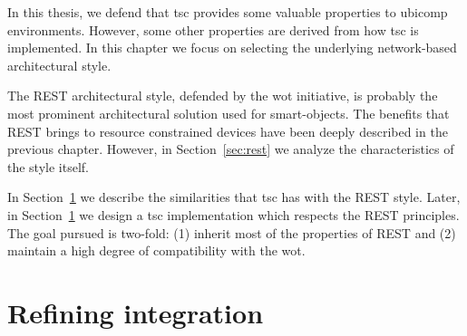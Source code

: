 In this thesis, we defend that \acf{tsc} provides some valuable properties to \ac{ubicomp} environments. %
However, some other properties are derived from how \ac{tsc} is implemented.
In this chapter we focus on selecting the underlying network-based architectural style.


The REST architectural style, defended by the \acf{wot} initiative, is probably the most prominent architectural solution used for smart-objects. %
The benefits that REST brings to resource constrained devices have been deeply described in the previous chapter.
However, in Section~\ref{sec:rest} we analyze the characteristics of the style itself.

In Section~\ref{} we describe the similarities that \ac{tsc} has with the REST style.
Later, in Section~\ref{} we design a \ac{tsc} implementation which respects the REST principles.
The goal pursued is two-fold: (1) inherit most of the properties of REST and (2) maintain a high degree of compatibility with the \ac{wot}.








\section{Refining integration} %


